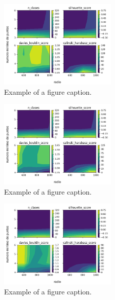  
\begin{figure}[htbp]
\centerline{\includegraphics[width=0.5\textwidth]{graficos_experimentos/dbscan/caracteristicos0_pca0.9.png}}
\caption{Example of a figure caption.}
\label{graficos_experimentos/dbscan/caracteristicos0_pca0.9.png}
\end{figure}
 
\begin{figure}[htbp]
\centerline{\includegraphics[width=0.5\textwidth]{graficos_experimentos/dbscan/caracteristicos0_pca0.95.png}}
\caption{Example of a figure caption.}
\label{graficos_experimentos/dbscan/caracteristicos0_pca0.95.png}
\end{figure}
 
\begin{figure}[htbp]
\centerline{\includegraphics[width=0.5\textwidth]{graficos_experimentos/dbscan/caracteristicos0_pca0.99.png}}
\caption{Example of a figure caption.}
\label{graficos_experimentos/dbscan/caracteristicos0_pca0.99.png}
\end{figure}
 

